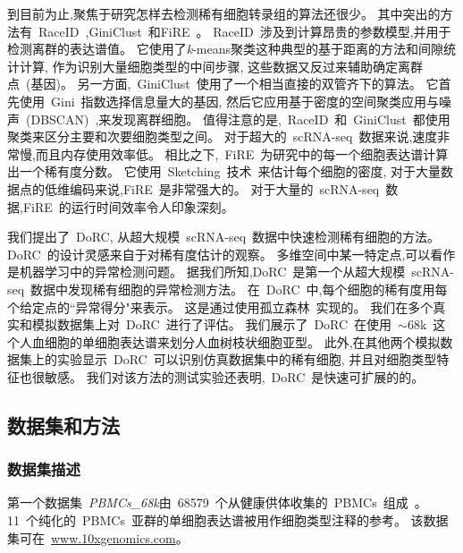 到目前为止,聚焦于研究怎样去检测稀有细胞转录组的算法还很少。
其中突出的方法有~RaceID~\cite{grun2015single},GiniClust~\cite{jiang2016giniclust}和FiRE~\cite{jindal2018discovery}。
RaceID~涉及到计算昂贵的参数模型,并用于检测离群的表达谱值。
它使用了\textit{k}-means聚类这种典型的基于距离的方法和间隙统计计算,
作为识别大量细胞类型的中间步骤,
这些数据又反过来辅助确定离群点~(基因)。
另一方面,~GiniClust~使用了一个相当直接的双管齐下的算法。
它首先使用~Gini~指数选择信息量大的基因,
然后它应用基于密度的空间聚类应用与噪声~(DBSCAN)~\cite{ester1996density},来发现离群细胞。
值得注意的是,~RaceID~和~GiniClust~都使用聚类来区分主要和次要细胞类型之间。
对于超大的~scRNA-seq~数据来说,速度非常慢,而且内存使用效率低。
相比之下,~FiRE~为研究中的每一个细胞表达谱计算出一个稀有度分数。
它使用~Sketching~技术~\cite{wang2007sizing}来估计每个细胞的密度,
对于大量数据点的低维编码来说,FiRE~是非常强大的。
对于大量的~scRNA-seq~数据,FiRE~的运行时间效率令人印象深刻。

我们提出了~DoRC,
从超大规模~scRNA-seq~数据中快速检测稀有细胞的方法。
DoRC~的设计灵感来自于对稀有度估计的观察。
多维空间中某一特定点,可以看作是机器学习中的异常检测问题。
据我们所知,DoRC~是第一个从超大规模~scRNA-seq~数据中发现稀有细胞的异常检测方法。
在~DoRC~中,每个细胞的稀有度用每个给定点的``异常得分"来表示。
这是通过使用孤立森林~\cite{liu2008isolation}实现的。
我们在多个真实和模拟数据集上对~DoRC~进行了评估。
我们展示了~DoRC~在使用~${\sim}68$k~这个人血细胞的单细胞表达谱来划分人血树枝状细胞亚型。
此外,在其他两个模拟数据集上的实验显示~DoRC~可以识别仿真数据集中的稀有细胞,
并且对细胞类型特征也很敏感。
我们对该方法的测试实验还表明,~DoRC~是快速可扩展的的。

\subsection{数据集和方法}
\label{sec:method}

\subsubsection{数据集描述}
\label{subsec:datasets} 
第一个数据集~\textit{PBMCs\_68k}由~68579~个从健康供体收集的~PBMCs~组成~\cite{zheng2017massively}。
11~个纯化的~PBMCs~亚群的单细胞表达谱被用作细胞类型注释的参考。
该数据集可在~\url{www.10xgenomics.com}。


